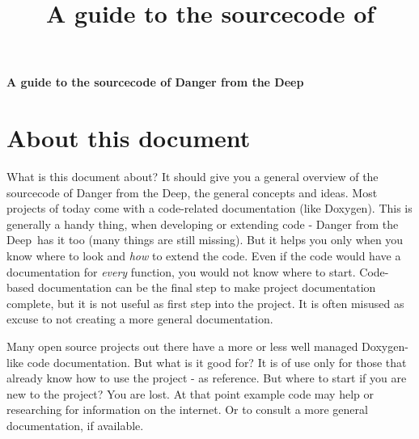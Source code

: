 \documentclass[english,a4paper,12pt]{report}
\title{A guide to the sourcecode of \dftd}
\newcommand{\dftd}{\textsf{Danger from the Deep}}
\begin{document}
\thispagestyle{empty}
\setlength{\parindent}{0em}
\begin{center}
\LARGE\setlength{\parindent}{0cm}
\textbf{A guide to the sourcecode of \dftd}
\end{center}
\pagebreak

\tableofcontents



\chapter{About this document}

What is this document about? It should give you a general overview of
the sourcecode of \dftd, the general concepts and ideas. Most projects
of today come with a code-related documentation (like Doxygen). This is
generally a handy thing, when developing or extending code - \dftd\ has
it too (many things are still missing). But it helps you only when you
know where to look and \emph{how} to extend the code.  Even if the code
would have a documentation for \emph{every} function, you would not know
where to start. Code-based documentation can be the final step to make
project documentation complete, but it is not useful as first step into
the project. It is often misused as excuse to not creating a more
general documentation.

Many open source projects out there have a more or less well managed
Doxygen-like code documentation. But what is it good for? It is of use
only for those that already know how to use the project - as reference.
But where to start if you are new to the project? You are lost. At that
point example code may help or researching for information on the
internet. Or to consult a more general documentation, if available.
\end{document}
